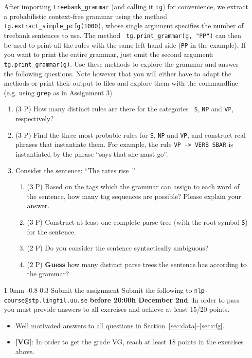 \documentclass[11pt]{article}
\makeatletter
\newcommand{\newsec}[2]{\section{#1}\label{sec:#2}\noindent}
\renewcommand{\section}{\@startsection
{section}%
{1}%
{0mm}%
{-0.8\baselineskip}%
{0.3\baselineskip}%
{\bfseries\large}}%
\makeatother
\begin{document}
\begin{center}
\fbox{

}
\end{center}
After importing {\tt treebank\_grammar} (and calling it {\tt tg}) for
convenience, we extract a probabilistic context-free grammar using the
method {\tt tg.extract\_simple\_pcfg(1000)}, whose single argument
specifies the number of treebank sentences to use. The method {\tt
  tg.print\_grammar(g, "PP")} can then be used to print all the rules
with the same left-hand side ({\tt PP} in the example). If you want to
print the entire grammar, just omit the second argument: {\tt
  tg.print\_grammar(g)}. Use these methods to explore the grammar and
answer the following questions. Note however that you will either have
to adapt the methods or print their output to files and explore them
with the commandline (e.g. using {\tt grep} as in Assignment 3).
\begin{enumerate}[topsep=0.2cm,itemsep=0cm]
\item (3 P) How many distinct rules are there for the categories {\tt
    S}, {\tt NP} and {\tt VP}, respectively?
\item (3 P) Find the three most probable rules for {\tt S}, {\tt NP}
  and {\tt VP}, and construct real phrases that instantiate them.  For
  example, the rule {\tt VP -> VERB SBAR} is instantiated by the
  phrase ``says that she must go''.
\item Consider the sentence: ``The rates rise .''
  \begin{enumerate}[noitemsep,topsep=0cm]
  \item (3 P) Based on the tags which the grammar can assign to each
    word of the sentence, how many tag sequences are possible? Please
    explain your answer.
\item (3 P) Construct at least one complete parse tree (with the root
  symbol {\tt S}) for the sentence.
\item (2 P) Do you consider the sentence syntactically ambiguous?
\item (2 P) \textbf{Guess} how many distinct parse trees the sentence
  has according to the grammar?
\end{enumerate}
\end{enumerate}

\newsec{Submit the assignment}{sub}%
Submit the following to {\tt nlp-course@stp.lingfil.uu.se}
\textbf{before 20:00h December 2nd}. In order to pass you must provide
answers to all exercises and achieve at least 15/20 points.
\begin{itemize}[noitemsep,topsep=0.2cm]
\item Well motivated answers to all questions in
  Section~\ref{sec:data}--\ref{sec:cfg}.
\item \textbf{[VG]}: In order to get the grade VG, reach at least 18
  points in the exercises above.
\end{itemize}
\end{document}
